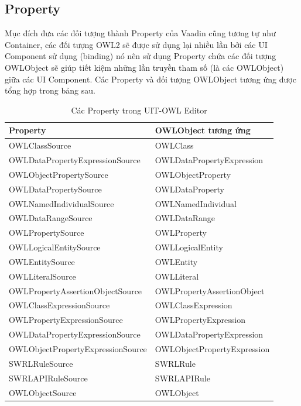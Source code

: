 \subsection{Property}
Mục đích đưa các đối tượng thành Property của Vaadin cũng tương tự như Container, các đối tượng OWL2 sẽ được sử dụng lại nhiều lần bởi các UI Component sử dụng (binding) nó nên sử dụng Property chứa các đối tượng OWLObject sẽ giúp tiết kiệm những lần truyền tham số (là các OWLObject) giữa các UI Component. Các Property và đối tượng OWLObject tương ứng được tổng hợp trong bảng sau.
\begin{table}[H]
	\centering
	\begin{tabular}{|l|l|}
		\hline
		Property & OWLObject tương ứng  \\
		\hline
		OWLClassSource	& OWLClass \\ 
		\hline
		OWLDataPropertyExpressionSource & OWLDataPropertyExpression  \\
		\hline
		OWLObjectPropertySource & OWLObjectProperty  \\		
		\hline
		OWLDataPropertySource	& OWLDataProperty   \\
		\hline
		OWLNamedIndividualSource& OWLNamedIndividual   \\
		\hline
		OWLDataRangeSource	& OWLDataRange   \\
		\hline
		OWLPropertySource 	& OWLProperty   \\
		\hline
		OWLLogicalEntitySource & OWLLogicalEntity \\
		\hline
		OWLEntitySource	& OWLEntity	 \\
		\hline
		OWLLiteralSource	& OWLLiteral \\
		\hline
		OWLPropertyAssertionObjectSource & OWLPropertyAssertionObject \\
		\hline
		OWLClassExpressionSource	& OWLClassExpression \\		
		\hline
		OWLPropertyExpressionSource	& OWLPropertyExpression  \\		
		\hline
		OWLDataPropertyExpressionSource	& OWLDataPropertyExpression \\		
		\hline
		OWLObjectPropertyExpressionSource	& OWLObjectPropertyExpression \\
		\hline	
		SWRLRuleSource	& SWRLRule	 \\
		\hline
		SWRLAPIRuleSource	& SWRLAPIRule \\
		\hline
		OWLObjectSource & OWLObject \\
		\hline
	\end{tabular}
	\caption{Các Property trong UIT-OWL Editor\label{overflow}}
\end{table}
